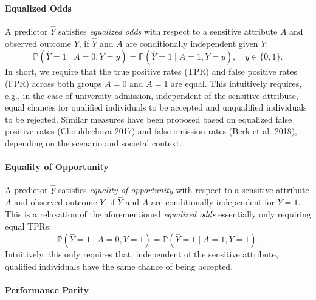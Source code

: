 \hypertarget{equalized-odds}{%
\paragraph{Equalized Odds}\label{equalized-odds}}

A predictor \(\hat{Y}\) satisfies \emph{equalized odds} with respect to a sensitive attribute \(A\) and observed outcome \(Y\), if \(\hat{Y}\) and \(A\) are conditionally independent given \(Y\):
\begin{equation}
\mathbb{P}\left(\hat{Y} = 1 \mid A = 0, Y = y\right) = \mathbb{P}\left(\hat{Y} = 1 \mid A = 1, Y = y\right), \quad y \in \{0,1\}.
\label{eq:eod}
\end{equation}
In short, we require that the true positive rates (TPR) and false positive rates (FPR) across both groups \(A = 0\) and \(A = 1\) are equal.
This intuitively requires, e.g., in the case of university admission, independent of the sensitive attribute, equal chances for qualified individuals to be accepted and unqualified individuals to be rejected.
Similar measures have been proposed based on equalized false positive rates (Chouldechova 2017) and false omission rates (Berk et al. 2018), depending on the scenario and societal context.

\hypertarget{equality-of-opportunity}{%
\paragraph{Equality of Opportunity}\label{equality-of-opportunity}}

A predictor \(\hat{Y}\) satisfies \emph{equality of opportunity} with respect to a sensitive attribute \(A\) and observed outcome \(Y\), if \(\hat{Y}\) and \(A\) are conditionally independent for \(Y = 1\).
This is a relaxation of the aforementioned \emph{equalized odds} essentially only requiring equal TPRs:
\begin{equation}
\mathbb{P}\left(\hat{Y} = 1 \mid A = 0, Y = 1\right) = \mathbb{P}\left(\hat{Y} = 1 \mid A = 1, Y = 1\right).
\label{eq:eop}
\end{equation}
Intuitively, this only requires that, independent of the sensitive attribute, qualified individuals have the same chance of being accepted.

\hypertarget{performance-parity}{%
\paragraph{Performance Parity}\label{performance-parity}}

